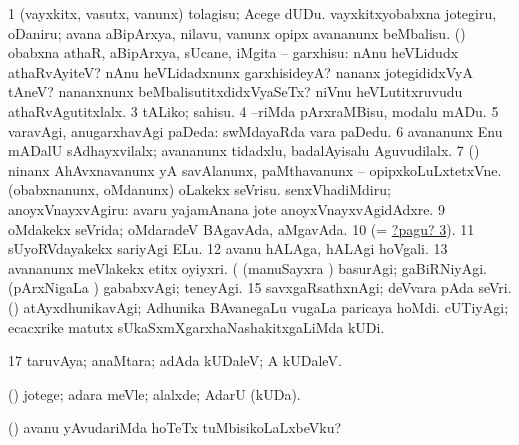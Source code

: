 \noindent
\gl{\pagu}
\expl{}
\bmng
\bnum
\num{1}  (vayxkitx, vasutx, \mo vanunx) tolagisu; Acege dUDu. 
  
\banum
{} vayxkitxyobabxna jotegiru, oDaniru; avana aBipArxya, nilavu, \mo vanunx opipx avananunx beMbalisu. 
 (\AmA) obabxna athaR, aBipArxya, sUcane, iMgita -- garxhisu:  nAnu heVLidudx athaRvAyiteV? nAnu heVLidadxnunx garxhisideyA? nananx jotegididxVyA tAneV? nananxnunx beMbalisutitxdidxVyaSeTx?  niVnu heVLutitxruvudu athaRvAgutitxlalx. 
\hypertarget{with pagu3}{} 
\eanum
\numie
\num{3}  tALiko; sahisu. 
\num{4}  --riMda pArxraMBisu, modalu mADu. 
\num{5}  varavAgi, anugarxhavAgi paDeda:  swMdayaRda vara paDedu. 
\num{6}  avananunx Enu mADalU sAdhayxvilalx; avananunx tidadxlu, badalAyisalu Aguvudilalx. 
\num{7}  (\pArxparx) ninanx AhAvxnavanunx yA savAlanunx, paMthavanunx -- opipxkoLuLxtetxVne. 
  
\banum
{} (obabxnanunx, oMdanunx) oLakekx seVrisu. 
 senxVhadiMdiru; anoyxVnayxvAgiru:  avaru yajamAnana jote anoyxVnayxvAgidAdxre. 
\eanum
\numie
\num{9}  oMdakekx seVrida; oMdaradeV BAgavAda, aMgavAda. 
\num{10}  (= \hyperlink{with pagu3}{?pagu? 3}). 
\num{11}  sUyoRVdayakekx sariyAgi ELu. 
\num{12}  avanu hALAga, hALAgi hoVgali. 
\num{13}  avananunx meVlakekx etitx oyiyxri. 
  (  
\banum
{} (manuSayxra \vi) basurAgi; gaBiRNiyAgi. 
 (pArxNigaLa \vi) gababxvAgi; teneyAgi. 
\eanum
\numie
\num{15}  savxgaRsathxnAgi; deVvara pAda seVri. 
  (\AmA) 
\banum
{} atAyxdhunikavAgi; Adhunika BAvanegaLu \mo vugaLa paricaya hoMdi. 
 cUTiyAgi; ecacxrike matutx sUkaSxmXgarxhaNashakitxgaLiMda kUDi. 
\eanum
\numie
\num{17}  taruvAya; anaMtara; adAda kUDaleV; A kUDaleV. 
\enum
\emng
\eentry

\bentry
{} 
\gl{\kirxvi}
\expl{}
\bmng
(\pArxparx) jotege; adara meVle; alalxde; AdarU (kUDa). 
\emng
\eentry

\bentry
{} 
\gl{\upa}
\expl{}
\bmng
(\pArxparx)  avanu yAvudariMda hoTeTx tuMbisikoLaLxbeVku? 
\emng
\eentry

